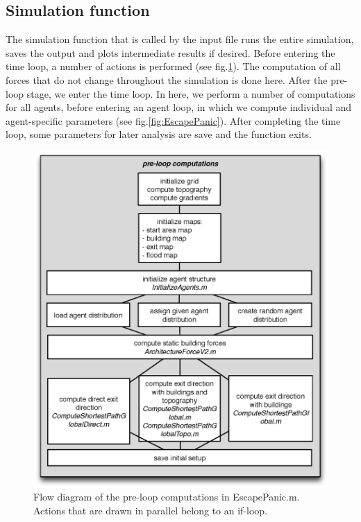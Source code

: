 \documentclass[11pt]{article}
\begin{document}
\begin{appendix}
\subsection{Simulation function}
The simulation function that is called by the input file runs the entire simulation, saves the output and plots intermediate results if desired. Before entering the time loop, a number of actions is performed (see fig.\ref{fig:pre-loop}). The computation of all forces that do not change throughout the simulation is done here. After the pre-loop stage, we enter the time loop. In here, we perform a number of computations for all agents, before entering an agent loop, in which we compute individual and agent-specific parameters (see fig.\ref{fig:EscapePanic}). After completing the time loop, some parameters for later analysis are save and the function exits. 
\begin{figure}
\centering
\includegraphics[height=0.5\textheight]{figures/PreLoopComputations}
\caption{Flow diagram of the pre-loop computations in EscapePanic.m. Actions that are drawn in parallel belong to an if-loop.}
\label{fig:pre-loop}
\end{figure}
\begin{figure}

\end{figure}
\end{appendix}
\end{document}
